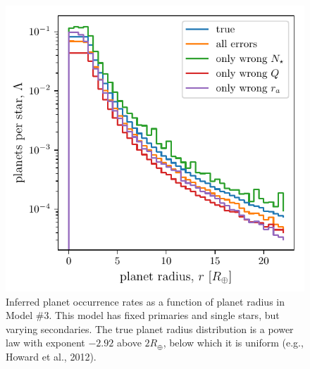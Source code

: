 \begin{figure}[!tb]
    \centering
    \includegraphics[width=\textwidth]{figures/errcases_rate_density_vs_radius_logs_model_3.pdf}
    \caption{
    Inferred planet occurrence rates as a function of planet radius in Model 
    \#3.
    This model has fixed primaries and single stars, but varying 
    secondaries.
    The true planet radius distribution is a power law with exponent $-2.92$ 
    above $2R_\oplus$, below which it is uniform (e.g., Howard et al., 
    2012).
    }
    \label{fig:errcases_model_3_log}
\end{figure}

